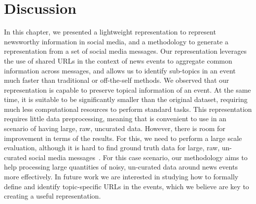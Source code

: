 \section{Discussion}\label{sec:conclusions}





In this chapter, we presented a lightweight representation to represent newsworthy
information in social media, and a methodology to generate a representation from
a set of social media messages. 
%
Our representation leverages the use of shared URLs in the context of news
events to aggregate common information across messages, and allows us to
identify sub-topics in an event much faster than traditional or off-the-self
methods.
%
We observed that our representation is capable to preserve topical information
of an event.
%
At the same time, it is suitable to be significantly smaller than the original
dataset, requiring much less computational resources to perform standard tasks.
%
This representation requires little data preprocessing, meaning that is
convenient to use in an scenario of having large, raw, uncurated data.
%
However, there is room for improvement in terms of the results.
%
For this, we need to perform a large scale evaluation, although it is hard to
find ground truth data for large, raw, un-curated social media
messages~\cite{Alonso:2015:WCW:2740908.2745397}.
%
For this case scenario, our methodology aims to help processing large quantities
of noisy, un-curated data around news events more effectively.
%
In future work we are interested in studying how to formally define and identify
topic-specific URLs in the events, which we believe are key to creating a useful
representation.
%
%